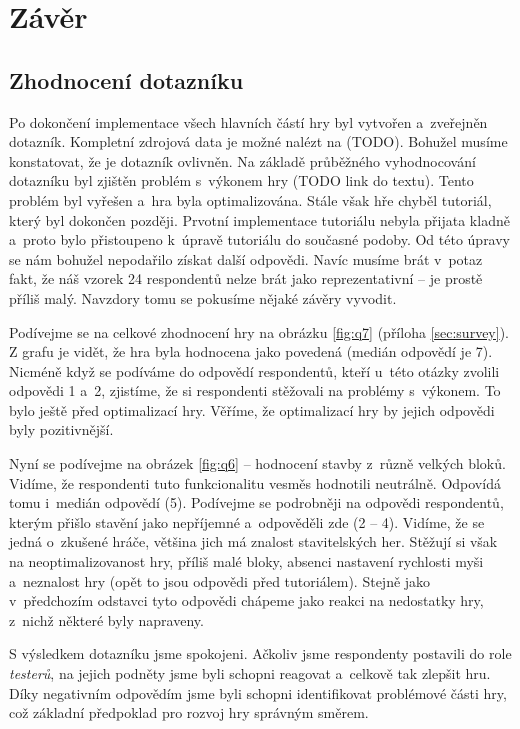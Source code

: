 
\chapter{Závěr}

\section{Zhodnocení dotazníku}
\label{sec:quest}

Po dokončení implementace všech hlavních částí hry byl vytvořen a~zveřejněn dotazník. Kompletní zdrojová data je možné nalézt na (TODO). Bohužel musíme konstatovat, že je dotazník ovlivněn. Na základě průběžného vyhodnocování dotazníku byl zjištěn problém s~výkonem hry (TODO link do textu). Tento problém byl vyřešen a~hra byla optimalizována. Stále však hře chyběl tutoriál, který byl dokončen později. Prvotní implementace tutoriálu nebyla přijata kladně a~proto bylo přistoupeno k~úpravě tutoriálu do současné podoby. Od této úpravy se nám bohužel nepodařilo získat další odpovědi. Navíc musíme brát v~potaz fakt, že náš vzorek 24 respondentů nelze brát jako reprezentativní -- je prostě příliš malý. Navzdory tomu se pokusíme nějaké závěry vyvodit.

Podívejme se na celkové zhodnocení hry na obrázku \ref{fig:q7} (příloha \ref{sec:survey}). Z grafu je vidět, že hra byla hodnocena jako povedená (medián odpovědí je 7). Nicméně když se podíváme do odpovědí respondentů, kteří u~této otázky zvolili odpovědi 1 a~2, zjistíme, že si respondenti stěžovali na problémy s~výkonem. To bylo ještě před optimalizací hry. Věříme, že optimalizací hry by jejich odpovědi byly pozitivnější. 

Nyní se podívejme na obrázek \ref{fig:q6} -- hodnocení stavby z~různě velkých bloků. Vidíme, že respondenti tuto funkcionalitu vesměs hodnotili neutrálně. Odpovídá tomu i~medián odpovědí (5). Podívejme se podrobněji na odpovědi respondentů, kterým přišlo stavění jako nepříjemné a~odpověděli zde (2 -- 4). Vidíme, že se jedná o~zkušené hráče, většina jich má znalost stavitelských her. Stěžují si však na neoptimalizovanost hry, příliš malé bloky, absenci nastavení rychlosti myši a~neznalost hry (opět to jsou odpovědi před tutoriálem). Stejně jako v~předchozím odstavci tyto odpovědi chápeme jako reakci na nedostatky hry, z~nichž některé byly napraveny.

S výsledkem dotazníku jsme spokojeni. Ačkoliv jsme respondenty postavili do role \textit{testerů}, na jejich podněty jsme byli schopni reagovat a~celkově tak zlepšit hru. Díky negativním odpovědím jsme byli schopni identifikovat problémové části hry, což základní předpoklad pro rozvoj hry správným směrem.

